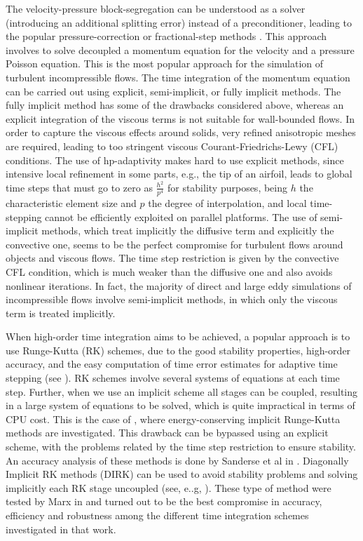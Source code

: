 The velocity-pressure block-segregation can be understood as a solver (introducing an additional splitting error) instead of a preconditioner, leading to the popular pressure-correction or fractional-step methods \cite{kim_application_1985,le_improvement_1991,codina_pressure_2006,badia_algebraic_2008}. This approach involves to solve decoupled a momentum equation for the velocity and a pressure Poisson equation. This is the most popular approach for the simulation of turbulent incompressible flows. The time integration of the momentum equation can be carried out using explicit, semi-implicit, or fully implicit methods. The fully implicit method has some of the drawbacks considered above, whereas an explicit integration of the viscous terms is not suitable for wall-bounded flows. In order to capture the viscous effects around solids, very refined anisotropic meshes are required, leading to too stringent viscous Courant-Friedrichs-Lewy (CFL) conditions. The use of hp-adaptivity makes hard to use explicit methods, since intensive local refinement in some parts, e.g., the tip of an airfoil, leads to global time steps that must go to zero as $\frac{h^2 }{p^4}$ for stability purposes, being $h$ the characteristic element size and $p$ the degree of interpolation, and local time-stepping cannot be efficiently exploited on parallel platforms. The use of semi-implicit methods, which treat implicitly the diffusive term and explicitly the convective one, seems to be the perfect compromise for turbulent flows around objects and viscous flows. The time step restriction is given by the convective {CFL} condition, which is much weaker than the diffusive one and also avoids nonlinear iterations. In fact, the majority of direct and large eddy simulations of incompressible flows involve semi-implicit methods, in which only the viscous term is treated implicitly. 

When high-order time integration aims to be achieved, a popular approach is to use Runge-Kutta (RK) schemes, due to the good stability properties, high-order accuracy, and the easy computation of time error estimates for adaptive time stepping (see \cite{hairer_numerical_1989,de_swart_construction_1997}). RK schemes involve several systems of equations at each time step. Further, when we use an implicit scheme all stages can be coupled, resulting in a large system of equations to be solved, which is quite impractical in terms of CPU cost. This is the case of \cite{sanderse_energy-conserving_2013}, where energy-conserving implicit Runge-Kutta methods are investigated. 
This drawback can be bypassed using an explicit scheme, with the problems related by the time step restriction to ensure stability. An accuracy analysis of these methods is done by Sanderse et al in \cite{sanderse_accuracy_2012}. 
Diagonally Implicit RK methods (DIRK) can be used to avoid stability problems and solving implicitly each RK stage uncoupled (see, e..g, \cite{marx_time_1994}). These type of method were tested by Marx in \cite{marx_time_1994} and turned out to be the best compromise in accuracy, efficiency and robustness among the different time integration schemes investigated in that work.

